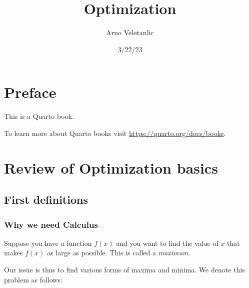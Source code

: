 \documentclass[
  letterpaper,
  DIV=11,
  numbers=noendperiod]{scrreprt}
\title{Optimization}
\author{Arno Veletanlic}
\date{3/22/23}
\renewcommand*\contentsname{Table of contents}
\newcommand\contentsname{Table of contents}
\begin{document}
\maketitle
\ifdefined\Shaded\renewenvironment{Shaded}{\begin{tcolorbox}[borderline west={3pt}{0pt}{shadecolor}, breakable, interior hidden, frame hidden, enhanced, boxrule=0pt, sharp corners]}{\end{tcolorbox}}\fi

\renewcommand*\contentsname{Table of contents}
{
\hypersetup{linkcolor=}
\setcounter{tocdepth}{2}
\tableofcontents
}

\hypertarget{preface}{%
\chapter*{Preface}\label{preface}}


This is a Quarto book.

To learn more about Quarto books visit
\url{https://quarto.org/docs/books}.


\hypertarget{review-of-optimization-basics}{%
\chapter{Review of Optimization
basics}\label{review-of-optimization-basics}}

\hypertarget{first-definitions}{%
\section{First definitions}\label{first-definitions}}

\hypertarget{why-we-need-calculus}{%
\subsection{Why we need Calculus}\label{why-we-need-calculus}}

Suppose you have a function \(f(x)\) and you want to find the value of
\(x\) that makes \(f(x)\) as large as possible. This is called a
\emph{maximum}.

Our issue is thus to find various forms of maxima and minima. We denote
this problem as follows:
\end{document}
